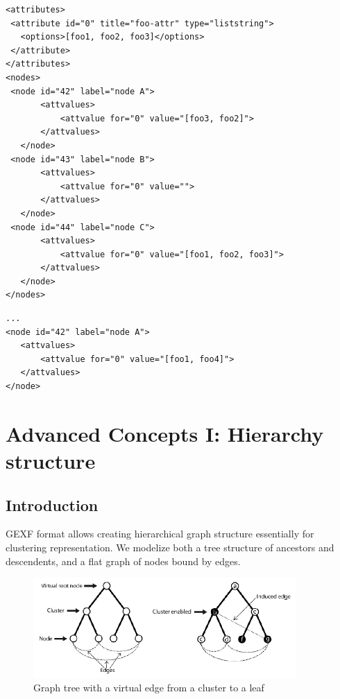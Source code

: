 \documentclass[a4paper,10pt]{article}
\begin{document}
\lstset{ style=gexf }
\begin{lstlisting}[caption={Valid values},label=validVal]
<attributes>
 <attribute id="0" title="foo-attr" type="liststring">
   <options>[foo1, foo2, foo3]</options>
 </attribute>
</attributes>
<nodes>
 <node id="42" label="node A">
       <attvalues>
           <attvalue for="0" value="[foo3, foo2]">
       </attvalues>
   </node>
 <node id="43" label="node B">
       <attvalues>
           <attvalue for="0" value="">
       </attvalues>
   </node>
 <node id="44" label="node C">
       <attvalues>
           <attvalue for="0" value="[foo1, foo2, foo3]">
       </attvalues>
   </node>
</nodes>
\end{lstlisting}

\lstset{ style=gexf }
\begin{lstlisting}[caption={Invalid value foo4},label=invalidVal]
...
<node id="42" label="node A">
   <attvalues>
       <attvalue for="0" value="[foo1, foo4]">
   </attvalues>
</node>
\end{lstlisting}

\section{Advanced Concepts I: Hierarchy structure} \label{hierarchy}

\subsection{Introduction}

GEXF format allows creating hierarchical graph structure essentially for clustering representation. We modelize both a tree structure of ancestors and descendents, and a flat graph of nodes bound by edges.

\begin{figure}[!ht]
  \begin{center}
  \includegraphics[width=10cm,keepaspectratio=true]{res/hierarchy.png}
  \caption{Graph tree with a virtual edge from a cluster to a leaf}
  \end{center}
\end{figure}
\end{document}
